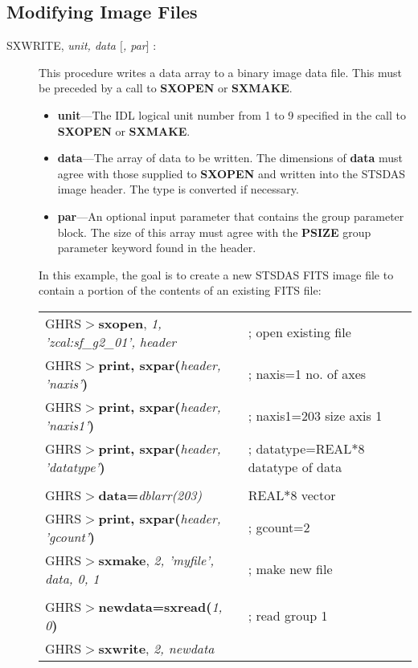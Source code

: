 \subsection{\bf Modifying Image Files}

\begin{description}
\item [SXWRITE, {\it unit, data $[$, par$]$} :] 

This procedure writes a data array to a binary image data file. This must be preceded by 
a call to {\bf SXOPEN} or {\bf SXMAKE}.

\begin{itemize}
\item {\bf unit}---The IDL logical unit number from 1 to 9 specified in the
call to {\bf SXOPEN} or {\bf SXMAKE}.

\item {\bf data}---The array of data to be written.  The dimensions of 
{\bf data} must agree with those supplied to {\bf SXOPEN} and written into 
the STSDAS image header.  The type is converted if necessary.

\item {\bf par}---An optional input parameter that contains the group parameter 
block.  The size of this array must agree with the {\bf PSIZE} group 
parameter keyword found in the header.

\end{itemize}
\newpage
\noindent
In this 
example, the goal is to create a new STSDAS FITS image file to
contain a portion of the contents of an existing FITS file:\\ 

\begin{small}
\begin{tabular}{ll}
GHRS$>${\bf sxopen}, {\it 1, 'zcal:sf\_g2\_01', header} & ; open existing file\\
GHRS$>${\bf print, sxpar(}{\it header, 'naxis'}{\bf )} & ; naxis=1 no. of axes\\
GHRS$>${\bf print, sxpar(}{\it header, 'naxis1'}{\bf )} & ; naxis1=203 size axis 1\\
GHRS$>${\bf print, sxpar(}{\it header, 'datatype'}{\bf )} & ; datatype=REAL$*$8 datatype of data\\
& \\
GHRS$>${\bf data=}{\it dblarr(203)} & REAL$*$8 vector\\
GHRS$>${\bf print, sxpar(}{\it header, 'gcount'}{\bf )} & ; gcount=2\\
GHRS$>${\bf sxmake}, {\it 2, 'myfile', data, 0, 1} & ; make new file\\
& \\
GHRS$>${\bf newdata=sxread(}{\it 1, 0}{\bf )} & ; read group 1\\
GHRS$>${\bf sxwrite}, {\it 2, newdata} & \\
\end{tabular}\\
\end{small}
\noindent


\end{description}
